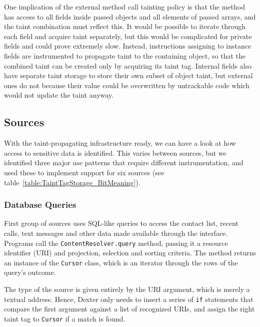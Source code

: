 \documentclass[12pt,twoside,notitlepage]{report}
\begin{document}
One implication of the external method call tainting policy is that the method has access to all fields inside passed objects and all elements of passed arrays, and the taint combination must reflect this. It would be possible to iterate through each field and acquire taint separately, but this would be complicated for private fields and could prove extremely slow. Instead, instructions assigning to instance fields are instrumented to propagate taint to the containing object, so that the combined taint can be created only by acquiring its taint tag. Internal fields also have separate taint storage to store their own subset of object taint, but external ones do not because their value could be overwritten by untrackable code which would not update the taint anyway.

\subsection{Sources}

With the taint-propagating infrastructure ready, we can have a look at how access to sensitive data is identified. This varies between sources, but we identified three major use patterns that require different instrumentation, and used these to implement support for six sources (see table~\ref{table:TaintTagStorage_BitMeaning}).

\subsubsection{Database Queries}

First group of sources uses SQL-like queries to access the contact list, recent calls, text messages and other data made available through the interface. Programs call the \verb$ContentResolver.query$ method, passing it a resource identifier (URI) and projection, selection and sorting criteria. The method returns an instance of the \verb$Cursor$ class, which is an iterator through the rows of the query's outcome. 

The type of the source is given entirely by the URI argument, which is merely a textual address. Hence, Dexter only needs to insert a series of \verb$if$ statements that compare the first argument against a list of recognized URIs, and assign the right taint tag to \verb$Cursor$ if a match is found.
\end{document}
